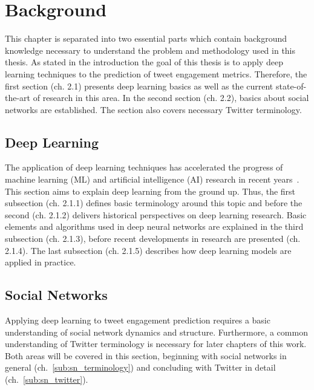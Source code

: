 \chapter{Background}

This chapter is separated into two essential parts which contain background
knowledge necessary to understand the problem and methodology used in this 
thesis. As stated in the introduction the goal of this thesis is to apply deep
learning techniques to the prediction of tweet engagement metrics. Therefore,
the first section (ch. 2.1) presents deep learning basics as well as the current
state-of-the-art of research in this area. In the second section (ch. 2.2), 
basics about social networks are established. The section also covers necessary 
Twitter terminology.

\section{Deep Learning}
\label{sec:deep_learning}

The application of deep learning techniques has accelerated the progress of 
machine learning (ML) and artificial intelligence (AI) research in recent years~\cite{Brynjolfsson2017}. 
This section aims to explain deep learning from the ground up. Thus, the 
first subsection (ch. 2.1.1) defines basic terminology around this topic 
and before the second (ch. 2.1.2) delivers historical perspectives on deep learning research. 
Basic elements and algorithms used in deep neural networks are explained in the third 
subsection (ch. 2.1.3), before recent developments in research are
presented (ch. 2.1.4). The last subsection (ch. 2.1.5) describes how
deep learning models are applied in practice.











\section{Social Networks}
\label{sec:social_networks}

Applying deep learning to tweet engagement prediction requires a basic
understanding of social network dynamics and structure. Furthermore, a common
understanding of Twitter terminology is necessary for later chapters of this
work. Both areas will be covered in this section, beginning with social
networks in general (ch.~\ref{sub:sn_terminology}) and concluding with
Twitter in detail (ch.~\ref{sub:sn_twitter}).




